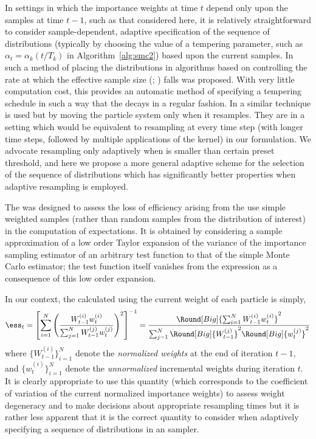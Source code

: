In settings in which the importance weights at time $t$ depend only upon the samples at time $t-1$, such as that considered here, it is relatively straightforward to consider sample-dependent, adaptive specification of the sequence of distributions (typically by choosing the value of a tempering parameter, such as $\alpha_t = \alpha_k(t/T_k)$ in Algorithm~\ref{alg:smc2}) based upon the current samples. In \cite{Jasra:2010eh} such a method of  placing the distributions in \smc algorithms based on controlling the rate at which the effective sample size (\ess; \cite{Kong:1994ul}) falls was proposed. With very little computation cost, this provides an automatic method of specifying a tempering schedule in such a way that the \ess decays in a regular fashion. In \cite[Algorithm 2]{Schafer:2011bx} a similar technique is used but by moving the particle system only when it resamples. They are in a setting which would be equivalent to resampling at every time step (with longer time steps, followed by multiple applications of the \mcmc kernel) in our formulation. We advocate resampling only adaptively when \ess is smaller than  certain preset threshold, and here we propose a more general adaptive scheme for the selection of the sequence of distributions which has significantly better properties when adaptive resampling is employed.

The \ess was designed to assess the loss of efficiency arising from the use  simple weighted samples (rather than random samples from the distribution of interest) in the computation of expectations. It is obtained by considering a sample approximation of a low order Taylor expansion of the variance of the importance sampling estimator of an arbitrary test function to that of the simple Monte Carlo estimator; the test function itself vanishes from the expression as a consequence of this low order expansion.

In our context, the \ess calculated using the current weight of each particle is simply,
\begin{equation}
  \ess_t = \left[ {\sum_{i=1}^N\left( \frac{W_{t-1}^{(i)}
          w_t^{(i)}}{\sum_{j=1}^NW_{t-1}^{(j)}w_t^{(j)}}\right)^2}
  \right]^{-1} = \frac{\Round[Big]{\sum_{i=1}^NW_{t-1}^{(i)}w_t^{(i)}}^2}
  {\sum_{j=1}^N\Round[Big]{W_{t-1}^{(j)}}^2\Round[Big]{w_t^{(j)}}^2}
\end{equation}
where $\{W_{t-1}^{(i)}\}_{i=1}^N$ denote the \emph{normalized weights} at the end of iteration $t - 1$, and $\{w_t^{(i)}\}_{i=1}^N$ denote the \emph{unnormalized} incremental weights during iteration $t$. It is clearly appropriate to use this quantity (which corresponds to the coefficient of variation of the current normalized importance weights) to assess weight degeneracy and to make decisions about appropriate resampling times \cite{DelMoral:2012jq} but it is rather less apparent that it is the correct quantity to consider when adaptively specifying a sequence of distributions in an \smc sampler.

